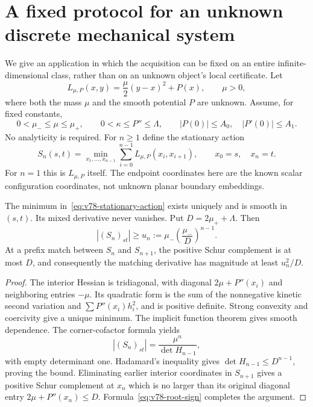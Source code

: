\section{A fixed protocol for an unknown discrete mechanical system}
\label{sec:v78-mechanics}

We give an application in which the acquisition can be fixed on an
entire infinite-dimensional class, rather than on an unknown object's
local certificate.  Let
\begin{equation}\label{eq:v78-lagrangian}
 L_{\mu,P}(x,y)=\frac{\mu}{2}(y-x)^2+P(x),\qquad \mu>0,
\end{equation}
where both the mass $\mu$ and the smooth potential $P$ are unknown.
Assume, for fixed constants,
\begin{equation}\label{eq:v78-mechanical-class}
 0<\mu_-\le\mu\le\mu_+,
 \qquad 0<\kappa\le P''\le\Lambda,
 \qquad |P(0)|\le A_0,\quad |P'(0)|\le A_1.
\end{equation}
No analyticity is required.  For $n\ge1$ define the stationary action
\begin{equation}\label{eq:v78-stationary-action}
 S_n(s,t)=\min_{x_1,\ldots,x_{n-1}}
       \sum_{i=0}^{n-1}L_{\mu,P}(x_i,x_{i+1}),
       \qquad x_0=s,\quad x_n=t.
\end{equation}
For $n=1$ this is $L_{\mu,P}$ itself.  The endpoint coordinates here
are the known scalar configuration coordinates, not unknown planar
boundary embeddings.

\begin{lemma}
\label{lem:v78-mechanical-twist}
The minimum in~\eqref{eq:v78-stationary-action} exists uniquely and is
smooth in $(s,t)$.  Its mixed derivative never vanishes.  Put
$D=2\mu_++\Lambda$.  Then
\begin{equation}\label{eq:v78-mechanical-twist-bound}
 |(S_n)_{st}|\ge
 u_n:=\mu_-\left(\frac{\mu_-}{D}\right)^{n-1}.
\end{equation}
At a prefix match between $S_n$ and $S_{n+1}$, the positive Schur
complement is at most $D$, and consequently the matching derivative
has magnitude at least $u_n^2/D$.
\end{lemma}
\begin{proof}
The interior Hessian is tridiagonal, with diagonal
$2\mu+P''(x_i)$ and neighboring entries $-\mu$.  Its quadratic form
is the sum of the nonnegative kinetic second variation and
$\sum P''(x_i)h_i^2$, and is positive definite.  Strong convexity and
coercivity give a unique minimum.  The implicit function theorem gives
smooth dependence.  The corner-cofactor formula yields
\[
             |(S_n)_{st}|=\frac{\mu^n}{\det H_{n-1}},
\]
with empty determinant one.  Hadamard's inequality gives
$\det H_{n-1}\le D^{n-1}$, proving the bound.  Eliminating earlier
interior coordinates in $S_{n+1}$ gives a positive Schur complement
at $x_n$ which is no larger than its original diagonal entry
$2\mu+P''(x_n)\le D$.  Formula~\eqref{eq:v78-root-sign} completes
the argument.
\end{proof}

